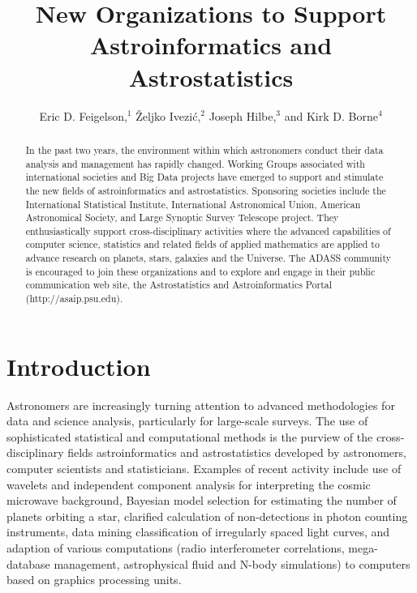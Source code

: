 
\resetcounters

\title{New Organizations to Support Astroinformatics and Astrostatistics}
\author{Eric D. Feigelson,$^1$ \v{Z}eljko Ivezi\'c,$^2$ Joseph Hilbe,$^3$ and Kirk D. Borne$^4$
}

\begin{abstract}
In the past two years, the environment within which astronomers conduct their data analysis and management has rapidly changed.  Working Groups associated with international societies and Big Data projects have emerged to support and stimulate the new fields of astroinformatics and astrostatistics.  Sponsoring societies include the International Statistical Institute, International Astronomical Union, American Astronomical Society, and Large Synoptic Survey Telescope project.  They enthusiastically support cross-disciplinary activities where the advanced capabilities of computer science, statistics and related fields of applied mathematics are applied to advance research on planets, stars, galaxies and the Universe.  The ADASS community is encouraged to join these organizations and to explore and engage in their public communication web site, the Astrostatistics and Astroinformatics Portal (http://asaip.psu.edu).  
\end{abstract}

\section{Introduction}

Astronomers are increasingly turning attention to advanced methodologies for data and science analysis, particularly for large-scale surveys. The use of sophisticated statistical and computational methods is the purview of the cross-disciplinary fields astroinformatics and astrostatistics developed by astronomers, computer scientists and statisticians. Examples of recent activity include use of wavelets and independent component analysis for interpreting the cosmic microwave background, Bayesian model selection for estimating the number of planets orbiting a star, clarified calculation of non-detections in photon counting instruments, data mining classification of irregularly spaced light curves, and adaption of various computations (radio interferometer correlations, mega-database management, astrophysical fluid and N-body simulations) to computers based on graphics processing units.  

